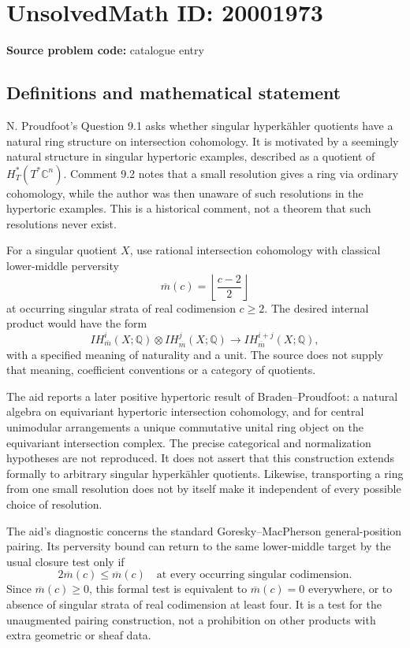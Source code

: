 \documentclass[11pt]{article}
\begin{document}
\section*{UnsolvedMath ID: 20001973}
\textbf{Source problem code:} catalogue entry
\subsection{Definitions and mathematical statement}
N. Proudfoot's Question 9.1 asks whether singular hyperk\"ahler quotients have a natural ring structure on intersection cohomology. It is motivated by a seemingly natural structure in singular hypertoric examples, described as a quotient of \(H_T^*(T^*\mathbb C^n)\). Comment 9.2 notes that a small resolution gives a ring via ordinary cohomology, while the author was then unaware of such resolutions in the hypertoric examples. This is a historical comment, not a theorem that such resolutions never exist.

For a singular quotient \(X\), use rational intersection cohomology with classical lower-middle perversity
\[
 \overline m(c)=\left\lfloor\frac{c-2}2\right\rfloor
\]
at occurring singular strata of real codimension \(c\geq2\). The desired internal product would have the form
\[
 IH_{\overline m}^i(X;\mathbb Q)\otimes
 IH_{\overline m}^j(X;\mathbb Q)
 \longrightarrow IH_{\overline m}^{i+j}(X;\mathbb Q),
\]
with a specified meaning of naturality and a unit. The source does not supply that meaning, coefficient conventions or a category of quotients.

The aid reports a later positive hypertoric result of Braden--Proudfoot: a natural algebra on equivariant hypertoric intersection cohomology, and for central unimodular arrangements a unique commutative unital ring object on the equivariant intersection complex. The precise categorical and normalization hypotheses are not reproduced. It does not assert that this construction extends formally to arbitrary singular hyperk\"ahler quotients. Likewise, transporting a ring from one small resolution does not by itself make it independent of every possible choice of resolution.

The aid's diagnostic concerns the standard Goresky--MacPherson general-position pairing. Its perversity bound can return to the same lower-middle target by the usual closure test only if
\[
 2\overline m(c)\leq\overline m(c)
 \quad\text{at every occurring singular codimension}.
\]
Since \(\overline m(c)\geq0\), this formal test is equivalent to \(\overline m(c)=0\) everywhere, or to absence of singular strata of real codimension at least four. It is a test for the unaugmented pairing construction, not a prohibition on other products with extra geometric or sheaf data.
\end{document}
